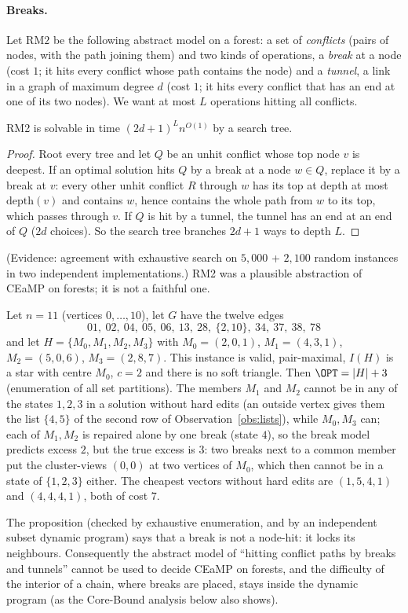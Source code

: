 \paragraph{Breaks.} Let $\mathrm{RM2}$ be the following abstract model on a forest: a set of \emph{conflicts} (pairs of nodes, with the path joining them) and two kinds of operations, a \emph{break} at a node (cost $1$; it hits every conflict whose path contains the node) and a \emph{tunnel}, a link in a graph of maximum degree $d$ (cost $1$; it hits every conflict that has an end at one of its two nodes). We want at most $L$ operations hitting all conflicts.
\begin{proposition}\label{prop:RM2}
RM2 is solvable in time $(2d+1)^{L}n^{O(1)}$ by a search tree.
\end{proposition}
\begin{proof}
Root every tree and let $Q$ be an unhit conflict whose top node $v$ is deepest. If an optimal solution hits $Q$ by a break at a node $w\in Q$, replace it by a break at $v$: every other unhit conflict $R$ through $w$ has its top at depth at most $\mathrm{depth}(v)$ and contains $w$, hence contains the whole path from $w$ to its top, which passes through $v$. If $Q$ is hit by a tunnel, the tunnel has an end at an end of $Q$ ($2d$ choices). So the search tree branches $2d+1$ ways to depth $L$.
\end{proof}
(Evidence: agreement with exhaustive search on $5{,}000$ + $2{,}100$ random instances in two independent implementations.) RM2 was a plausible abstraction of CEaMP on forests; it is not a faithful one.
\begin{proposition}\label{prop:hub}
Let $n=11$ (vertices $0,\dots,10$), let $G$ have the twelve edges
\[01,\ 02,\ 04,\ 05,\ 06,\ 13,\ 28,\ \{2,10\},\ 34,\ 37,\ 38,\ 78\]
and let $H=\{M_0,M_1,M_2,M_3\}$ with $M_0=(2,0,1)$, $M_1=(4,3,1)$, $M_2=(5,0,6)$, $M_3=(2,8,7)$. This instance is valid, pair-maximal, $I(H)$ is a star with centre $M_0$, $c=2$ and there is no soft triangle. Then $\OPT=|H|+3$ (enumeration of all set partitions). The members $M_1$ and $M_2$ cannot be in any of the states $1,2,3$ in a solution without hard edits (an outside vertex gives them the list $\{4,5\}$ of the second row of Observation~\ref{obs:lists}), while $M_0,M_3$ can; each of $M_1,M_2$ is repaired alone by one break (state $4$), so the break model predicts excess $2$, but the true excess is $3$: two breaks next to a common member put the cluster-views $(0,0)$ at two vertices of $M_0$, which then cannot be in a state of $\{1,2,3\}$ either. The cheapest vectors without hard edits are $(1,5,4,1)$ and $(4,4,4,1)$, both of cost $7$.
\end{proposition}
The proposition (checked by exhaustive enumeration, and by an independent subset dynamic program) says that a break is not a node-hit: it locks its neighbours. Consequently the abstract model of ``hitting conflict paths by breaks and tunnels'' cannot be used to decide CEaMP on forests, and the difficulty of the interior of a chain, where breaks are placed, stays inside the dynamic program (as the Core-Bound analysis below also shows).

